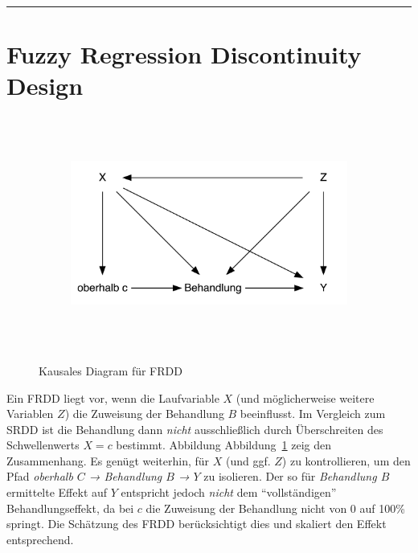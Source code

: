\documentclass[
  a4paper,
  DIV=11,
  oneside]{scrreprt}
\begin{document}
\begin{center}\rule{0.5\linewidth}{0.5pt}\end{center}

\hypertarget{fuzzy-regression-discontinuity-design}{%
\section{Fuzzy Regression Discontinuity
Design}\label{fuzzy-regression-discontinuity-design}}

\begin{figure}

{\centering 

\begin{figure}[H]

{\centering \includegraphics[width=5in,height=3in]{RDD_files/figure-latex/dot-figure-2.png}

}

\end{figure}

}

\caption{\label{fig-CDFRDD}Kausales Diagram für FRDD}

\end{figure}

Ein FRDD liegt vor, wenn die Laufvariable \(X\) (und möglicherweise
weitere Variablen \(Z\)) die Zuweisung der Behandlung \(B\) beeinflusst.
Im Vergleich zum SRDD ist die Behandlung dann \emph{nicht}
ausschließlich durch Überschreiten des Schwellenwerts \(X = c\)
bestimmt. Abbildung Abbildung~\ref{fig-CDFRDD} zeig den Zusammenhang. Es
genügt weiterhin, für \(X\) (und ggf. \(Z\)) zu kontrollieren, um den
Pfad \emph{oberhalb \(C\) → Behandlung \(B\) → \(Y\)} zu isolieren. Der
so für \emph{Behandlung \(B\)} ermittelte Effekt auf \(Y\) entspricht
jedoch \emph{nicht} dem ``vollständigen'' Behandlungseffekt, da bei
\(c\) die Zuweisung der Behandlung nicht von 0 auf 100\% springt. Die
Schätzung des FRDD berücksichtigt dies und skaliert den Effekt
entsprechend.
\end{document}
